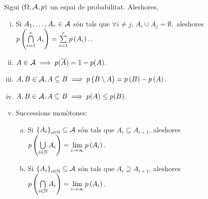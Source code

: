 \begin{prop}
    Sigui $(\Omega,\mathcal{A}, p)$ un espai de probabilitat. Aleshores,
    \begin{enumerate}[i)]
        \item Si $A_1, \dots, A_r \in \mathcal{A}$ són tals que $\forall i\neq j,\, A_i \cup A_j = \emptyset,$ aleshores $p\left( \bigcap\limits_{i=1}^{r} A_i \right)= \sum\limits_{i=1}^{r} p\left( A_i \right).$.
        \item \label{item:esp_prob_2}$A \in \mathcal{A} \implies p(\overline{A})=1-p(A)$.
        \item \label{item:esp_prob_3}$A,B \in \mathcal{A}, A \subseteq B \implies p\left( B\setminus A \right) = p\left( B\right) - p\left( A\right)$.
        \item $A,B \in \mathcal{A}, A \subseteq B \implies p(A) \le p(B)$.
        \item \label{item:esp_prob_5}Successions monòtones:
        \begin{enumerate}[a)]
         \item Si $\left\{A_i\right\}_{i\in\mathbb{N}} \subseteq \mathcal{A}$ són tals que $A_i\subseteq A_{i+1}$, aleshores $p\left( \bigcup\limits_{i\in\mathbb{N}} A_i\right) = \lim\limits_{i\to\infty} p\left( A_i\right)$.
         \item Si $\left\{A_i\right\}_{i\in\mathbb{N}} \subseteq \mathcal{A}$ són tals que $A_i\supseteq A_{i+1}$, aleshores $p\left( \bigcap\limits_{i\in\mathbb{N}} A_i\right) = \lim\limits_{i\to\infty} p\left( A_i\right)$.
        \end{enumerate}
    \end{enumerate}
\end{prop}

